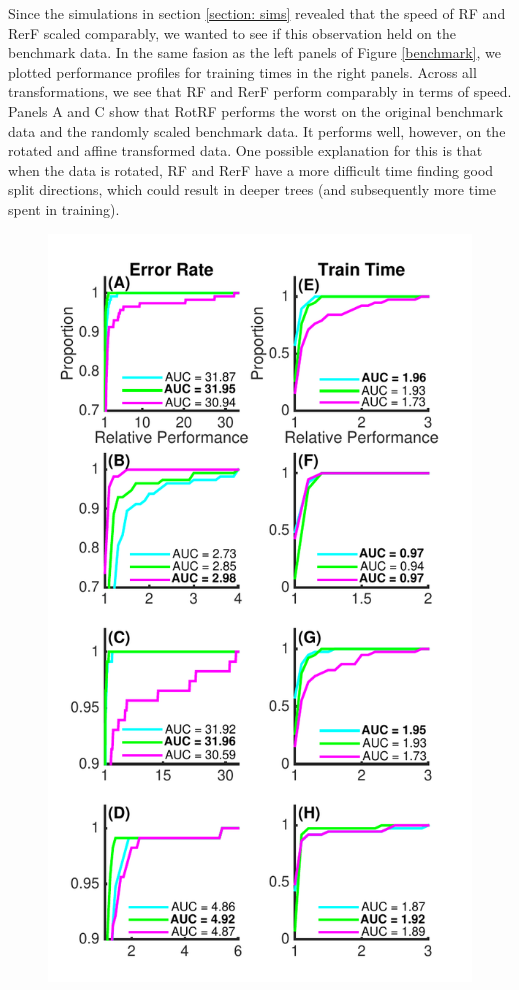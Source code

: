 \documentclass{article}
\begin{document}
Since the simulations in section \ref{section: sims} revealed that the speed of RF and RerF scaled comparably, we wanted to see if this observation held on the benchmark data. In the same fasion as the left panels of Figure \ref{benchmark}, we plotted performance profiles for training times in the right panels. Across all transformations, we see that RF and RerF perform comparably in terms of speed. Panels A and C show that RotRF performs the worst on the original benchmark data and the randomly scaled benchmark data. It performs well, however, on the rotated and affine transformed data. One possible explanation for this is that when the data is rotated, RF and RerF have a more difficult time finding good split directions, which could result in deeper trees (and subsequently more time spent in training).  

\begin{figure}[ht]
\vskip 0.2in
\begin{center}
\centerline{\includegraphics[scale=0.5]{../Figures/pdf/Fig4_benchmark2}}

\end{center}
\end{figure}
\end{document}
